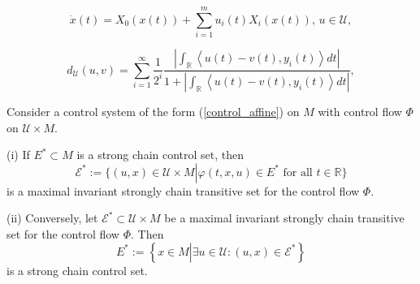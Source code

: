\documentclass[10pt,a4paper]{amsart}
\begin{document}
\begin{equation}
\dot{x}(t)=X_{0}(x(t))+\sum_{i=1}^{m}u_{i}(t)X_{i}(x(t)),\,u\in\mathcal{U},
\label{control_affine}%
\end{equation}

\begin{equation}
d_{\mathcal{U}}(u,v)=\sum_{i=1}^{\infty}\frac{1}{2^{i}}\frac{\left\vert
\int_{\mathbb{R}}\left\langle u(t)-v(t),y_{i}(t)\right\rangle dt\right\vert
}{1+\left\vert \int_{\mathbb{R}}\left\langle u(t)-v(t),y_{i}(t)\right\rangle
dt\right\vert }, \label{metric_U}%
\end{equation}

\begin{theorem}
\label{Theorem_equivalence}Consider a control system of the form
(\ref{control_affine}) on $M$ with control flow $\Phi$ on $\mathcal{U}\times
M$.

(i) If $E^{\ast}\subset M$ is a strong chain control set, then%
\begin{equation}
\mathcal{E}^{\ast}:=\{(u,x)\in\mathcal{U}\times M\left\vert \varphi(t,x,u)\in
E^{\ast}\text{ for all }t\in\mathbb{R}\right.  \} \label{lift_E}%
\end{equation}
is a maximal invariant strongly chain transitive set for the control flow
$\Phi$.

(ii) Conversely, let $\mathcal{E}^{\ast}\subset\mathcal{U}\times M$ be a
maximal invariant strongly chain transitive set for the control flow $\Phi$.
Then
\begin{equation}
E^{\ast}:=\left\{  x\in M\left\vert \exists u\in\mathcal{U}:(u,x)\in
\mathcal{E}^{\ast}\right.  \right\}  \label{down_E}%
\end{equation}
is a strong chain control set.
\end{theorem}
\end{document}
